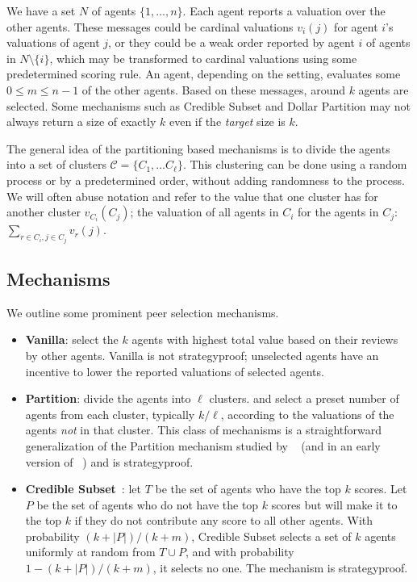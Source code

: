 \documentclass[letterpaper]{article}
\newcommand{\clusterset}{\ensuremath{\mathcal{C}}}
\newcommand{\citet}[1]{\citeauthor{#1}~\shortcite{#1}}
\newcommand{\citep}{\cite}
\begin{document}
We have a set $N$ of agents $\{1,\ldots, n\}$. Each agent reports a valuation over the other agents. These messages could be cardinal valuations $v_i(j)$ for agent $i$'s valuations of agent $j$, or they could be a weak order reported by agent $i$ of agents in $N\setminus \{i\}$, which may be transformed to cardinal valuations using some predetermined scoring rule.
An agent, depending on the setting, evaluates some $0 \leq m \leq n-1$ of the other agents.
Based on these messages, around $k$ agents are selected.
Some mechanisms such as Credible Subset and Dollar Partition may not always return a size of exactly $k$ even if the \emph{target} size is $k$.



The general idea of the partitioning based mechanisms is to divide the agents into a set of clusters $\clusterset = \{C_1, \ldots C_{\ell}\}$. This clustering can be done using a random process or by a predetermined order, without adding randomness to the process. We will often abuse notation and refer to the value that one cluster has for another cluster $v_{C_i}(C_j)$; the valuation of all agents in $C_i$ for the agents in $C_j$: $\sum_{r \in C_i, j \in C_j} v_r(j)$.

\subsection{Mechanisms}

We outline some prominent peer selection mechanisms.

\begin{itemize}[leftmargin=*]
\setlength\itemsep{0em}


\item \textbf{Vanilla}: %
select the $k$ agents with highest total value based on their reviews by other agents.
Vanilla is not strategyproof; unselected agents have an incentive to lower the reported valuations of selected agents.
\item \textbf{Partition}: divide the agents into ${\ell}$ clusters. and select a preset number of agents from each cluster, typically $k/\ell$, according to the valuations of the agents \emph{not} in that cluster. This class of mechanisms is a straightforward generalization of the Partition mechanism studied by \citet{AFPT11a} (and in an early version of \citet{KLMP15b}) and is strategyproof.
\item \textbf{Credible Subset}~\citep{KLMP15b}:
let $T$ be the set of agents who have the top $k$ scores.
Let $P$ be the set of agents who do not have the top $k$ scores but will make it to the top $k$ if they do not contribute any score to all other agents.
With probability $(k+|P|)/(k+m)$, Credible Subset selects a set of $k$ agents uniformly at random from $T\cup P$, and with probability $1-(k+|P|)/(k+m)$, it selects no one. The mechanism is strategyproof. %



\end{itemize}
\end{document}
